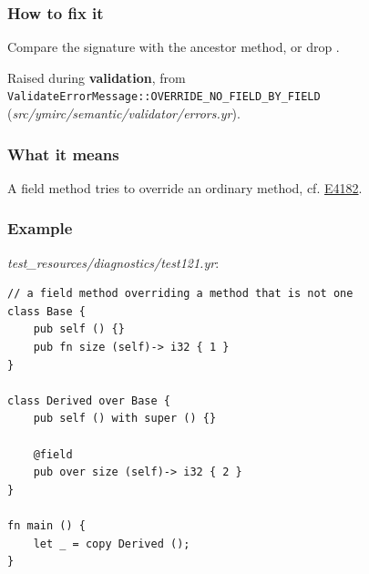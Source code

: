 \subsubsection*{How to fix it}

Compare the signature with the ancestor method, or drop .

\label{sec:codes:e4190}

Raised during \textbf{validation}, from \texttt{ValidateErrorMessage::\allowbreak{}OVERRIDE\_\allowbreak{}NO\_\allowbreak{}FIELD\_\allowbreak{}BY\_\allowbreak{}FIELD} (\textit{src/\allowbreak{}ymirc/\allowbreak{}semantic/\allowbreak{}validator/\allowbreak{}errors.yr}).

\subsubsection*{What it means}

A field method tries to override an ordinary method, cf. \hyperref[sec:codes:e4182]{E4182}.

\subsubsection*{Example}

\textit{test\_\allowbreak{}resources/\allowbreak{}diagnostics/\allowbreak{}test121.yr}:

\begin{lstlisting}[style=coloredverbatimError]
// a field method overriding a method that is not one
class Base {
    pub self () {}
    pub fn size (self)-> i32 { 1 }
}

class Derived over Base {
    pub self () with super () {}

    @field
    pub over size (self)-> i32 { 2 }
}

fn main () {
    let _ = copy Derived ();
}
\end{lstlisting}

